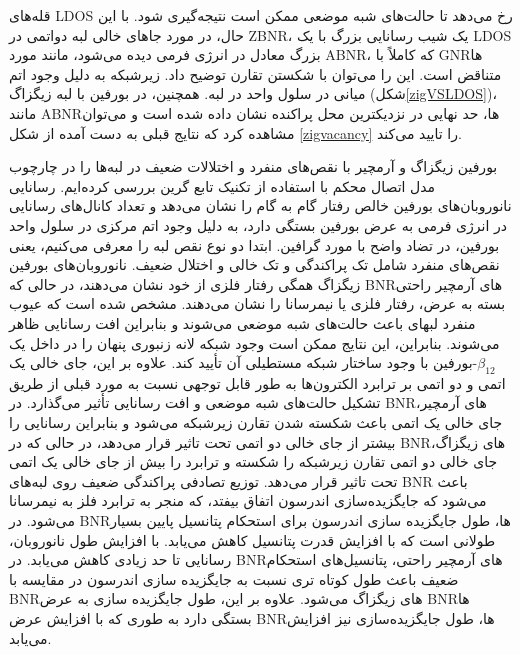 قله‌های \gls{LDOS} رخ ‌می‌دهد تا حالت‌های شبه موضعی ممکن است نتیجه‌گیری شود. با این حال، در مورد جاهای خالی لبه دواتمی‌‌ در \gls{ZBNR}، یک شیب رسانایی بزرگ با یک \gls{LDOS} بزرگ معادل در انرژی فر‌‌می‌‌ دیده ‌می‌شود، مانند مورد \gls{ABNR}، که کاملاً با \gls{GNR}ها متناقض است. این را ‌‌می‌‌توان با شکستن تقارن توضیح داد. زیرشبکه به دلیل وجود اتم ‌میانی در سلول واحد در لبه. همچنین، در ‌بورفین با لبه زیگزاگ (شکل\ref{zigVSLDOS})، مانند \gls{ABNR}ها، حد نهایی  در نزدیکترین محل پراکنده نشان داده شده است و ‌‌می‌‌توان مشاهده کرد که نتایج قبلی به دست آمده از شکل \ref{zigvacancy} را تایید ‌‌می‌‌کند.

بورفین زیگزاگ و آرمچیر با نقص‌های منفرد و اختلالات ضعیف در لبه‌ها را در چارچوب مدل اتصال محکم با استفاده از تکنیک تابع گرین بررسی کرده‌ایم. رسانایی نانوروبان‌های ‌بورفین خالص رفتار گام به گام را نشان ‌می‌دهد و تعداد کانال‌های رسانایی در انرژی فر‌‌می‌‌ به عرض ‌بورفین بستگی دارد، به دلیل وجود اتم مرکزی در سلول واحد ‌بورفین، در تضاد واضح با مورد گرافین. ابتدا دو نوع نقص لبه را معرفی ‌می‌کنیم، یعنی نقص‌های منفرد شامل تک پراکندگی و تک خالی و اختلال ضعیف. نانوروبان‌های ‌بورفین زیگزاگ همگی رفتار فلزی از خود نشان ‌می‌دهند، در حالی که \gls{BNR}های آرمچیر راحتی بسته به عرض، رفتار فلزی یا نیمرسانا را نشان ‌می‌دهند. مشخص شده است که عیوب منفرد لبهای باعث حالت‌های شبه موضعی ‌می‌شوند و بنابراین افت رسانایی ظاهر ‌می‌شوند. بنابراین، این نتایج ممکن است وجود شبکه لانه زنبوری پنهان را در داخل یک $\beta_{12}$-‌بورفین با وجود ساختار شبکه مستطیلی آن تأیید کند. علاوه بر این، جای خالی یک  اتمی‌‌ و دو  اتمی‌‌ بر ترابرد الکترون‌ها به طور قابل توجهی نسبت به مورد قبلی از طریق تشکیل حالت‌های شبه موضعی و افت رسانایی تأثیر ‌‌می‌‌گذارد. در \gls{BNR}‌های آرمچیر، جای خالی یک  اتمی‌‌ باعث شکسته شدن تقارن زیرشبکه ‌‌می‌‌شود و بنابراین رسانایی را بیشتر از جای خالی دو  اتمی‌‌ تحت تاثیر قرار ‌‌می‌‌دهد، در حالی که در \gls{BNR}‌های زیگزاگ، جای خالی دو  اتمی‌‌ تقارن زیرشبکه را شکسته و ترابرد را بیش از جای خالی یک  اتمی‌‌ تحت تاثیر قرار ‌‌می‌‌دهد. توزیع تصادفی پراکندگی ضعیف روی لبه‌های \gls{BNR} باعث ‌می‌شود که جایگزیده‌سازی اندرسون اتفاق بیفتد، که منجر به ترابرد فلز به نیمرسانا ‌می‌شود. در \gls{BNR}‌ها، طول جایگزیده سازی اندرسون برای استحکام پتانسیل پایین بسیار طولانی است که با افزایش قدرت پتانسیل کاهش ‌‌می‌‌یابد. با افزایش طول نانوروبان، رسانایی تا حد زیادی کاهش ‌‌می‌‌یابد. در \gls{BNR}‌های آرمچیر راحتی، پتانسیل‌های استحکام ضعیف باعث طول کوتاه تری نسبت به جایگزیده سازی اندرسون در مقایسه با \gls{BNR}‌های زیگزاگ ‌‌می‌‌شود. علاوه بر این، طول جایگزیده سازی به عرض \gls{BNR}‌ها بستگی دارد به طوری که با افزایش عرض \gls{BNR}‌ها، طول جایگزیده‌سازی نیز افزایش ‌‌می‌‌یابد.

